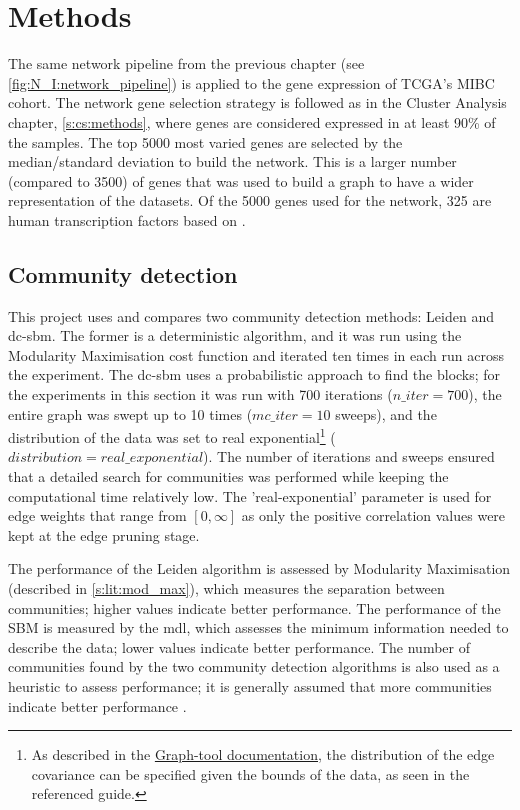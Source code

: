 \section{Methods}


The same network pipeline from the previous chapter (see \cref{fig:N_I:network_pipeline}) is applied to the gene expression of TCGA's MIBC cohort. The network gene selection strategy is followed as in the Cluster Analysis chapter, \cref{s:cs:methods}, where genes are considered expressed in at least 90\% of the samples. The top 5000 most varied genes are selected by the median/standard deviation to build the network. This is a larger number (compared to 3500) of genes that was used to build a graph to have a wider representation of the datasets. Of the 5000 genes used for the network, 325 are human transcription factors based on \citet{Lambert2018-el}.
 
\subsection*{Community detection} \label{s:N_I:sel_tfs_methods_comm_detection}

This project uses and compares two community detection methods: Leiden and \acrfull{dc-sbm}. The former is a deterministic algorithm, and it was run using the Modularity Maximisation cost function and iterated ten times in each run across the experiment. The \acrshort{dc-sbm} uses a probabilistic approach to find the blocks; for the experiments in this section it was run with 700 iterations ($n\_iter=700$), the entire graph was swept up to 10 times ($mc\_iter=10$ sweeps), and the distribution of the data was set to real exponential\footnote{As described in the \href{https://graph-tool.skewed.de/static/doc/demos/inference/inference.html}{Graph-tool documentation}, the distribution of the edge covariance can be specified given the bounds of the data, as seen in the referenced guide.} ($distribution=real\_exponential$). The number of iterations and sweeps ensured that a detailed search for communities was performed while keeping the computational time relatively low. The 'real-exponential' parameter is used for edge weights that range from $[0, \infty]$ as only the positive correlation values were kept at the edge pruning stage.

The performance of the Leiden algorithm is assessed by Modularity Maximisation (described in \cref{s:lit:mod_max}), which measures the separation between communities; higher values indicate better performance. The performance of the SBM is measured by the \acrfull{mdl}, which assesses the minimum information needed to describe the data; lower values indicate better performance. The number of communities found by the two community detection algorithms is also used as a heuristic to assess performance; it is generally assumed that more communities indicate better performance \citep{Care2019-ij}.

